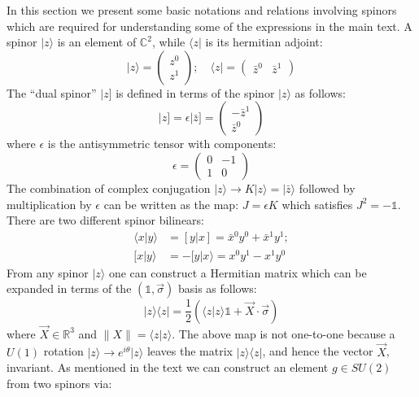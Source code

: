\documentclass[twocolumn,draft,aps,nofootinbib,nobibnotes,final]{revtex4-2}
\newcommand{\C}{\mathbb{C}}
\newcommand{\mbb}[1]{\mathbb{#1}}
\newcommand{\id}{\mathbb{1}}
\newcommand{\innerp}[2]{\langle #1 \vert #2 \rangle}
\newcommand{\bra}[1]{\langle #1 \vert}
\newcommand{\ket}[1]{\vert #1 \rangle}
\newcommand{\norm}[1]{\lVert #1 \rVert}
\newcommand{\rket}[1]{\vert #1 ]}
\newcommand{\rinnerp}[2]{[ #1 \vert #2 ]}
\newcommand{\innerpB}[2]{[ #1 \vert #2 \rangle}
\newcommand{\onehalf}{\frac{1}{2}}
\begin{document}
In this section we present some basic notations and relations involving spinors \cite{Livine2011Loop} which are required for understanding some of the expressions in the main text. A spinor $ \ket{z} $ is an element of $ \C^2 $, while $ \bra{z} $ is its hermitian adjoint:
\begin{equation}\label{eqn:spinors}
	\ket{z} = \begin{pmatrix}
		z^0 \\ z^1
	\end{pmatrix}; \quad \bra{z} = \begin{pmatrix}
									\bar z^0 & \bar z^1
									\end{pmatrix}
\end{equation}
The ``dual spinor'' $ \rket{z} $ is defined in terms of the spinor $ \ket{z} $ as follows:
\begin{equation}\label{eqn:dual-spinors}
	\rket{z} = \epsilon \rket{\bar z} = \begin{pmatrix}
											-\bar z^1 \\ \bar z^0
										\end{pmatrix}
\end{equation}
where $ \epsilon $ is the antisymmetric tensor with components:
\begin{equation}\label{eqn:epsilon-tensor}
	\epsilon = \begin{pmatrix}
					0 & -1 \\
					1 & 0
				\end{pmatrix}
\end{equation}
The combination of complex conjugation $ \ket{z} \rightarrow K \ket{z} = \ket{\bar z} $ followed by multiplication by $ \epsilon $ can be written as the map: $ J = \epsilon K $ which satisfies $ J^2 = -\id $. There are two different spinor bilinears:
\begin{align}\label{eqn:spinor-bilinears}
	\innerp{x}{y} & = \rinnerp{y}{x} = \bar x^0 y^0 + \bar x^1 y^1; \nonumber \\
	\innerpB{x}{y} & = -\innerpB{y}{x} = x^0 y^1 - x^1 y^0
\end{align}
From any spinor $ \ket{z} $ one can construct a Hermitian matrix which can be expanded in terms of the $ (\id, \vec{\sigma}) $ basis as follows:
\begin{equation}\label{eqn:spinor-matrix}
	\ket{z}\bra{z} = \onehalf (\innerp{z}{z} \id + \vec{X} \cdot \vec{\sigma})
\end{equation}
where $ \vec{X} \in \mbb{R}^3$ and $ \norm{X} = \innerp{z}{z}$. The above map is not one-to-one because a $ U(1) $ rotation $ \ket{z} \rightarrow e^{i\theta} \ket{z}$ leaves the matrix $ \ket{z}\bra{z} $, and hence the vector $ \vec{X} $, invariant. As mentioned in the text we can construct an element $ g \in SU(2) $ from two spinors via:
\end{document}
